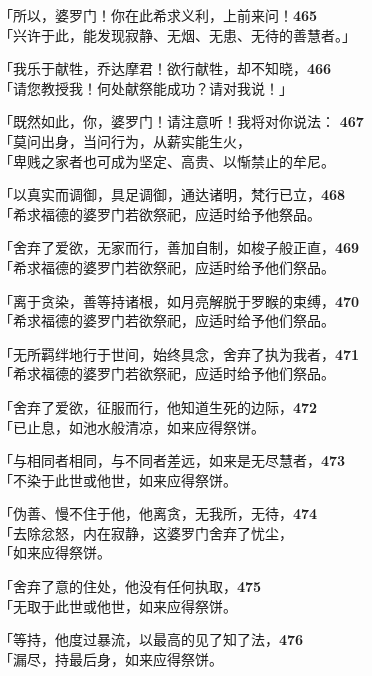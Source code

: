 「所以，婆罗门！你在此希求义利，上前来问！\hfill{\grayfootnotesize \textbf{465}} \\
「兴许于此，能发现寂静、无烟、无患、无待的善慧者。」


「我乐于献牲，乔达摩君！欲行献牲，却不知晓，\hfill{\grayfootnotesize \textbf{466}} \\
「请您教授我！何处献祭能成功？请对我说！」


「既然如此，你，婆罗门！请注意听！我将对你说法： \hfill{\grayfootnotesize \textbf{467}} \\
「莫问出身，当问行为，从薪实能生火，\\
「卑贱之家者也可成为坚定、高贵、以惭禁止的牟尼。


「以真实而调御，具足调御，通达诸明，梵行已立，\hfill{\grayfootnotesize \textbf{468}} \\
「希求福德的婆罗门若欲祭祀，应适时给予他祭品。


「舍弃了爱欲，无家而行，善加自制，如梭子般正直，\hfill{\grayfootnotesize \textbf{469}} \\
「希求福德的婆罗门若欲祭祀，应适时给予他们祭品。


「离于贪染，善等持诸根，如月亮解脱于罗睺的束缚，\hfill{\grayfootnotesize \textbf{470}} \\
「希求福德的婆罗门若欲祭祀，应适时给予他们祭品。


「无所羁绊地行于世间，始终具念，舍弃了执为我者，\hfill{\grayfootnotesize \textbf{471}} \\
「希求福德的婆罗门若欲祭祀，应适时给予他们祭品。


「舍弃了爱欲，征服而行，他知道生死的边际，\hfill{\grayfootnotesize \textbf{472}} \\
「已止息，如池水般清凉，如来应得祭饼。


「与相同者相同，与不同者差远，如来是无尽慧者，\hfill{\grayfootnotesize \textbf{473}} \\
「不染于此世或他世，如来应得祭饼。


「伪善、慢不住于他，他离贪，无我所，无待，\hfill{\grayfootnotesize \textbf{474}} \\
「去除忿怒，内在寂静，这婆罗门舍弃了忧尘，\\
「如来应得祭饼。


「舍弃了意的住处，他没有任何执取，\hfill{\grayfootnotesize \textbf{475}} \\
「无取于此世或他世，如来应得祭饼。


「等持，他度过暴流，以最高的见了知了法，\hfill{\grayfootnotesize \textbf{476}} \\
「漏尽，持最后身，如来应得祭饼。


